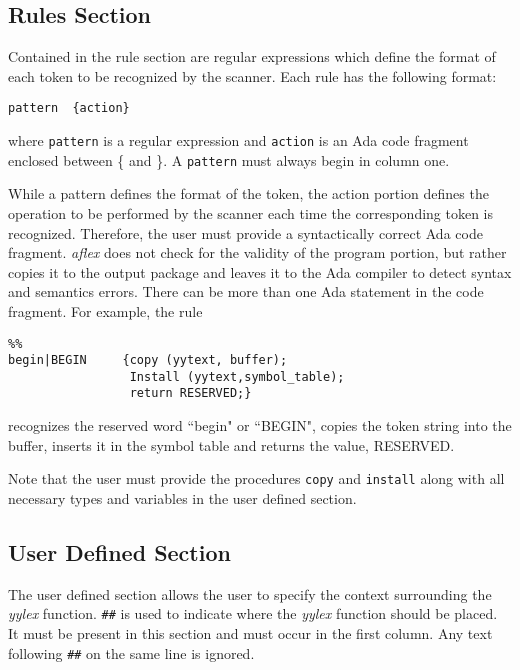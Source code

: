 \subsection{Rules Section}

Contained in the rule section are regular expressions which define the
format of each token to be recognized by the scanner.
Each rule has the following format:

\begin{verbatim}
pattern  {action}
\end{verbatim}

where {\tt pattern} is a regular expression and {\tt action} is an Ada 
code fragment enclosed between \{ and \}.  A {\tt pattern} must 
always begin in column one.

\mysk
While a pattern defines the format of the token, the action portion
defines
the operation to be performed by the scanner each time the corresponding
token is recognized.  Therefore, the user must provide a syntactically
correct Ada code fragment.  {\sl aflex} does not check for the validity of the
program portion, but rather copies it to the output package and leaves it to
the Ada compiler to detect syntax and semantics errors.  There can be more 
than one Ada statement in the code fragment.  For example, the rule

\small
\begin{verbatim}
%%
begin|BEGIN     {copy (yytext, buffer);
                 Install (yytext,symbol_table);
                 return RESERVED;}
\end{verbatim}
\normalsize

recognizes the reserved word ``begin" or ``BEGIN", copies the
token string into the buffer, inserts it in the symbol table and returns 
the value, RESERVED.  

Note that the user must provide the procedures
{\tt copy} and {\tt install} along with all necessary types and variables
in the user defined section.

\subsection{User Defined Section}
The user defined section allows the user to specify the context surrounding
the {\sl yylex} function.  \verb|##| is used to indicate where the 
{\sl yylex} function should be placed. It must be present in this 
section and must occur in the first column.  Any text following \verb|##|
on the same line is ignored.


